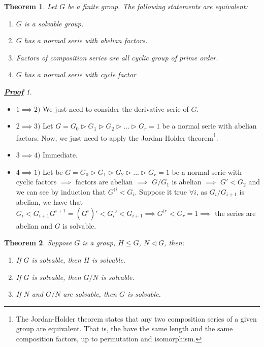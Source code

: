 \documentclass[a4paper, 10pt]{article}
\theoremstyle{plain}
\newtheorem{teorema}{Theorem}[section]
\theoremstyle{definition}
\theoremstyle{remark}
\newtheorem*{prueba}{\textbf{\textit{\underline{Proof}}}}
\begin{document}
    \begin{teorema}
        Let $G$ be a finite group. The following statements are equivalent:
        \begin{enumerate}
            \item $G$ is a solvable group.
            \item $G$ has a normal serie with abelian factors.
            \item Factors of composition series are all cyclic group of prime order.
            \item $G$ has a normal serie with cycle factor
        \end{enumerate}
    \end{teorema}

    \begin{prueba}
    \begin{itemize}   
        \item $1\implies 2)$ We just need to consider the derivative serie of $G$.
        \item $2\implies 3)$ Let $G=G_0\vartriangleright G_1 \vartriangleright G_2 \vartriangleright ... \vartriangleright G_r=1$ be a normal serie with abelian factors. Now, we just need to apply the Jordan-Holder theorem\footnote[1]{The Jordan-Holder theorem states that any two composition series of a given group are equivalent. That is, the have the same length and the same composition factors, up to permutation and isomorphism.}.
        \item $3\implies 4)$ Immediate.
        \item $4 \implies 1)$ Let be $G=G_0\vartriangleright G_1 \vartriangleright G_2 \vartriangleright ... \vartriangleright G_r=1$ be a normal serie with cyclic factors $\implies$ factors are abelian $\implies$ $G/G_1$ is abelian $\implies$ $G'<G_2$ and we can see by induction that $G^{(i}<G_i$. Suppose it true $\forall i$, as $G_i/G_{i+1}$ is abelian, we have that $G_i<G_{i+1} G^{i+1}=(G^i)'<G_i'<G_{i+1} \implies G^{(r}<G_r=1\implies$ the series are abelian and $G$ is solvable.
    \end{itemize}
    \end{prueba}

    \begin{teorema}
        Suppose $G$ is a group, $H \leqslant G$, $N\vartriangleleft G$, then:
        \begin{enumerate}
            \item If $G$ is solvable, then $H$ is solvable.
            \item If $G$ is solvable, then $G/N$ is solvable.
            \item If $N$ and $G/N$ are solvable, then $G$ is solvable.
        \end{enumerate}
    \end{teorema}
\end{document}
